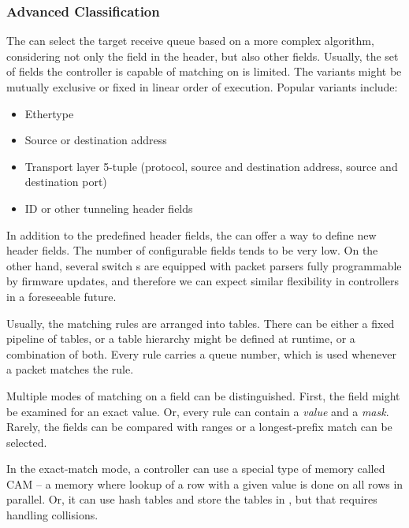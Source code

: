 \subsubsection{Advanced Classification}
\label{offload:classification}

The  can select the target receive queue based on a more complex
algorithm, considering not only the  field in the  header, but
also other fields. Usually, the set of fields the controller is capable of
matching on is limited. The variants might be mutually exclusive or fixed in
linear order of execution. Popular variants include:

\begin{itemize}
	\item Ethertype
	\item Source or destination  address
	\item Transport layer 5-tuple (protocol, source and destination address,
	      source and destination port)
	\item {} ID or other tunneling header fields
\end{itemize}

In addition to the predefined header fields, the  can offer a way to define
new header fields. The number of configurable fields tends to be very low. On the
other hand, several switch s are equipped with packet parsers fully
programmable by firmware updates, and therefore we can expect similar
flexibility in  controllers in a foreseeable future.

Usually, the matching rules are arranged into tables. There can be either a fixed pipeline of
tables, or a table hierarchy might be defined at runtime, or a combination of
both. Every rule carries a queue number, which is used whenever a packet
matches the rule.

Multiple modes of matching on a field can be distinguished. First, the field
might be examined for an exact value. Or, every rule can contain a \emph{value}
and a \emph{mask}. Rarely, the fields can be compared with ranges or
a longest-prefix match can be selected.

In the exact-match mode, a controller can use a special type of memory called
\acrfull{CAM} -- a memory where lookup of a row with a given value is done on all
rows in parallel. Or, it can use hash tables and store the tables in ,
but that requires handling collisions.


